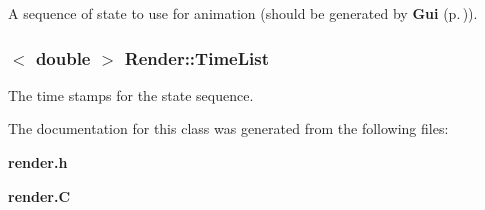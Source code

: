 A sequence of state to use for animation (should be generated by {\bf Gui} {\rm (p.\,\pageref{classGui})}).

\subsubsection{$<$ double $>$ Render::Time\-List\hspace{0.3cm}{\tt  [protected]}}\label{classRender_n2}


The time stamps for the state sequence.



The documentation for this class was generated from the following files:\begin{CompactItemize}
\item 
{\bf render.h}\item 
{\bf render.C}\end{CompactItemize}
